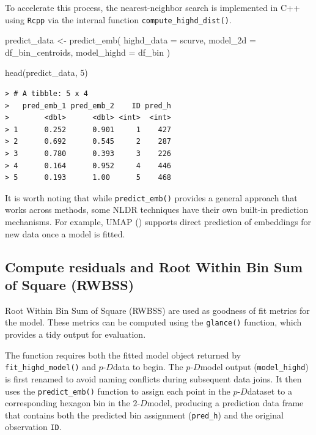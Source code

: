 \documentclass[
  11pt,
  a4paper,
]{report}
\newenvironment{Shaded}{\begin{snugshade}}{\end{snugshade}}
\newcommand{\AttributeTok}[1]{\textcolor[rgb]{0.40,0.45,0.13}{#1}}
\newcommand{\DecValTok}[1]{\textcolor[rgb]{0.68,0.00,0.00}{#1}}
\newcommand{\FunctionTok}[1]{\textcolor[rgb]{0.28,0.35,0.67}{#1}}
\newcommand{\NormalTok}[1]{\textcolor[rgb]{0.00,0.23,0.31}{#1}}
\newcommand{\OtherTok}[1]{\textcolor[rgb]{0.00,0.23,0.31}{#1}}
\newcommand\pD{$p\text{-}D$}
\newcommand{\twoD}{$2\text{-}D$}
\begin{document}
To accelerate this process, the nearest-neighbor search is implemented
in C++ using \texttt{Rcpp} via the internal function
\texttt{compute\_highd\_dist()}.

\begin{Shaded}
\begin{Highlighting}[]
\NormalTok{predict\_data }\OtherTok{\textless{}{-}} \FunctionTok{predict\_emb}\NormalTok{(}
  \AttributeTok{highd\_data =}\NormalTok{ scurve, }
  \AttributeTok{model\_2d =}\NormalTok{ df\_bin\_centroids, }
  \AttributeTok{model\_highd =}\NormalTok{ df\_bin}
\NormalTok{  )}

\FunctionTok{head}\NormalTok{(predict\_data, }\DecValTok{5}\NormalTok{)}
\end{Highlighting}
\end{Shaded}

\begin{verbatim}
> # A tibble: 5 x 4
>   pred_emb_1 pred_emb_2    ID pred_h
>        <dbl>      <dbl> <int>  <int>
> 1      0.252      0.901     1    427
> 2      0.692      0.545     2    287
> 3      0.780      0.393     3    226
> 4      0.164      0.952     4    446
> 5      0.193      1.00      5    468
\end{verbatim}

It is worth noting that while \texttt{predict\_emb()} provides a general
approach that works across methods, some NLDR techniques have their own
built-in prediction mechanisms. For example, UMAP
() supports direct prediction of
embeddings for new data once a model is fitted.

\subsection{Compute residuals and Root Within Bin Sum of Square
(RWBSS)}\label{compute-residuals-and-root-within-bin-sum-of-square-rwbss}

Root Within Bin Sum of Square (RWBSS) are used as goodness of fit
metrics for the model. These metrics can be computed using the
\texttt{glance()} function, which provides a tidy output for evaluation.

The function requires both the fitted model object returned by
\texttt{fit\_highd\_model()} and \pD data to begin. The \pD model output
(\texttt{model\_highd}) is first renamed to avoid naming conflicts
during subsequent data joins. It then uses the \texttt{predict\_emb()}
function to assign each point in the \pD dataset to a corresponding
hexagon bin in the \twoD model, producing a prediction data frame that
contains both the predicted bin assignment (\texttt{pred\_h}) and the
original observation \texttt{ID}.
\end{document}
